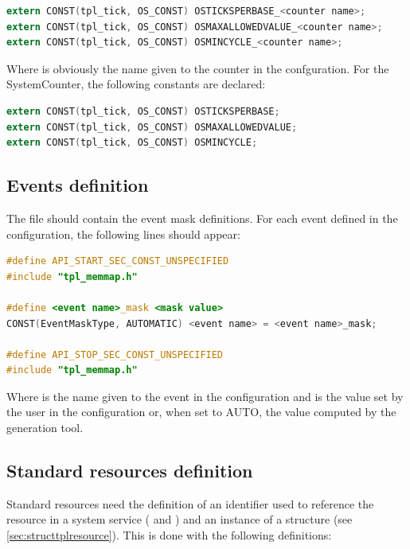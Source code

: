\begin{lstlisting}[language=C]
extern CONST(tpl_tick, OS_CONST) OSTICKSPERBASE_<counter name>;
extern CONST(tpl_tick, OS_CONST) OSMAXALLOWEDVALUE_<counter name>;
extern CONST(tpl_tick, OS_CONST) OSMINCYCLE_<counter name>;
\end{lstlisting}

Where  is obviously the name given to the counter in the confguration. For the SystemCounter, the following constants are declared:

\begin{lstlisting}[language=C]
extern CONST(tpl_tick, OS_CONST) OSTICKSPERBASE;
extern CONST(tpl_tick, OS_CONST) OSMAXALLOWEDVALUE;
extern CONST(tpl_tick, OS_CONST) OSMINCYCLE;
\end{lstlisting}

\subsection{Events definition}

The  file should contain the event mask definitions. For each event defined in the configuration, the following lines should appear:

\begin{lstlisting}[language=C]
#define API_START_SEC_CONST_UNSPECIFIED
#include "tpl_memmap.h"

#define <event name>_mask <mask value>
CONST(EventMaskType, AUTOMATIC) <event name> = <event name>_mask;

#define API_STOP_SEC_CONST_UNSPECIFIED
#include "tpl_memmap.h"
\end{lstlisting}

Where  is the name given to the event in the configuration and  is the value set by the user in the configuration or, when set to AUTO, the value computed by the generation tool.

\subsection{Standard resources definition}

Standard resources need the definition of an identifier used to reference the resource in a system service ( and ) and an instance of a  structure (see \ref{sec:structtplresource}). This is done with the following definitions:

